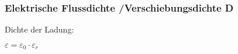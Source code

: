 \subsubsection*{Elektrische Flussdichte /Verschiebungsdichte D}
    \begin{minipage}{0.49\linewidth}
        \begin{center}
            Dichte der Ladung:\\
        \end{center}
    \end{minipage}
    \begin{minipage}{0.49\linewidth}
        \begin{center}
                $\varepsilon = \varepsilon_0 \cdot \varepsilon_r$
        \end{center}
    \end{minipage}    

        
       